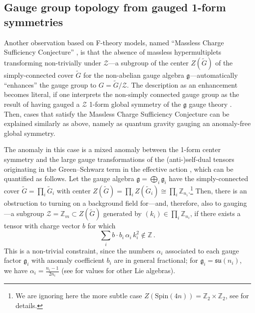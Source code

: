 \documentclass[11pt, a4paper]{article}
\newcommand*{\bbZ}{\ensuremath{\mathbb{Z}}}
\newcommand*{\cZ}{\ensuremath{\mathcal{Z}}}
\newcommand*{\fkg}{\ensuremath{\mathfrak{g}}}
\newcommand*{\fksu}{\ensuremath{\mathfrak{su}}}
\begin{document}
\subsection{Gauge group topology from gauged 1-form symmetries}
\label{sec:1-form_anomalies}

Another observation based on F-theory models, named ``Massless Charge Sufficiency Conjecture'' \cite{Morrison:2021wuv,Raghuram:2020vxm}, is that the absence of massless hypermultiplets transforming non-trivially under $\cZ$---a subgroup of the center $Z(\widetilde{G})$ of the simply-connected cover $\widetilde{G}$ for the non-abelian gauge algebra $\fkg$---automatically ``enhances'' the gauge group to $G = \widetilde{G}/\cZ$.
The description as an enhancement becomes literal, if one interprets the non-simply connected gauge group as the result of having gauged a $\cZ$ 1-form global symmetry of the $\fkg$ gauge theory \cite{Gaiotto:2014kfa}.
Then, cases that satisfy the Massless Charge Sufficiency Conjecture can be explained similarly as above, namely as quantum gravity gauging an anomaly-free global symmetry.

The anomaly in this case is a mixed anomaly between the 1-form center symmetry and the large gauge transformations of the (anti-)self-dual tensors originating in the Green--Schwarz term in the effective action  \cite{Apruzzi:2020zot}, which can be quantified as follows.
Let the gauge algebra $\fkg = \bigoplus_i \fkg_i$ have the simply-connected cover $\widetilde{G} = \prod_i \widetilde{G}_i$ with center $Z(\widetilde{G}) = \prod_i Z(\widetilde{G}_i) \cong \prod_i \bbZ_{n_i}$.\footnote{We are ignoring here the more subtle case $Z(\text{Spin}(4n)) = \bbZ_2 \times \bbZ_2$, see \cite{Apruzzi:2020zot} for details.}
Then, there is an obstruction to turning on a background field for---and, therefore, also to gauging---a subgroup $\cZ = \bbZ_m \subset Z(\widetilde{G})$ generated by $(k_i) \in \prod_i \bbZ_{n_i}$, if there exists a tensor with charge vector $b$ for which
\begin{equation}\label{eq:1-form_anomaly}
    \sum_i b \cdot b_i \, \alpha_{i} \, k_i^2 \notin \bbZ \, .
\end{equation}
This is a non-trivial constraint, since the numbers $\alpha_i$ associated to each gauge factor $\fkg_i$ with anomaly coefficient $b_i$ are in general fractional; for $\fkg_i = \fksu(n_i)$, we have $\alpha_i = \frac{n_i-1}{2n_i}$ \cite{Kapustin:2014gua} (see \cite{Cordova:2019uob} for values for other Lie algebras).
\end{document}
